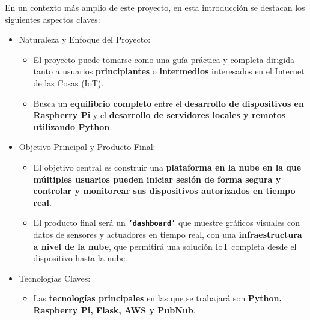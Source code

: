 \documentclass{report}
\begin{document}
En un contexto más amplio de este proyecto, en esta introducción se destacan los siguientes aspectos claves:
\begin{itemize}
    \item Naturaleza y Enfoque del Proyecto:
    \begin{itemize}
        \item El proyecto puede tomarse como una guía práctica y completa dirigida tanto a usuarios \textbf{principiantes} o 
        \textbf{intermedios} interesados en el Internet de las Cosas (IoT).
        \item Busca un \textbf{equilibrio completo} entre el \textbf{desarrollo de dispositivos en Raspberry Pi} y el 
        \textbf{desarrollo de servidores locales y remotos utilizando Python}.
    \end{itemize}

    \item Objetivo Principal y Producto Final:
    \begin{itemize}                                                                                                                        
        \item El objetivo central es construir una \textbf{plataforma en la nube en la que múltiples usuarios pueden iniciar 
        sesión de forma segura y controlar y monitorear sus dispositivos autorizados en tiempo real}.
        \item El producto final será un \textbf{\texttt{'dashboard'}} que muestre gráficos visuales con datos de sensores y 
        actuadores en tiempo real, con una \textbf{infraestructura a nivel de la nube}, que permitirá una solución IoT completa 
        desde el dispositivo hasta la nube.
    \end{itemize}

    \item Tecnologías Claves:
    \begin{itemize}
        \item Las \textbf{tecnologías principales} en las que se trabajará son \textbf{Python, Raspberry Pi, Flask, AWS y PubNub}.
    \end{itemize}
\end{itemize}
\end{document}
